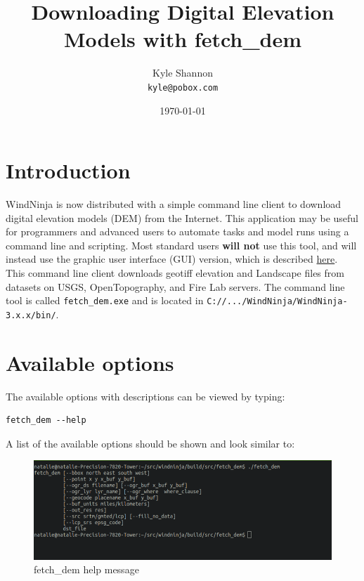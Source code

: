 \documentclass[12pt,oneside,final]{article}
\title{Downloading Digital Elevation Models with fetch\_dem}
\author{Kyle Shannon \\
\texttt{kyle@pobox.com}}
\date{\today}
\begin{document}
\maketitle

\section{Introduction}
WindNinja is now distributed with a simple command line client to download
digital elevation models (DEM) from the Internet.  This application may be
useful for programmers and advanced users to automate tasks and model runs using a
command line and scripting.
Most standard users \textbf{will not} use this tool, and will instead use the graphic
user interface (GUI) version, which is described
\href{run:./download_elevation_file.pdf}{here}.  This
command line client downloads geotiff elevation and Landscape files from
datasets on USGS, OpenTopography, and Fire Lab servers.  The command line tool is called \texttt{fetch\_dem.exe} and
is located in \texttt{C://.../WindNinja/WindNinja-3.x.x/bin/}.
\section{Available options}
The available options with descriptions can be viewed by typing:
\begin{verbatim}fetch_dem --help\end{verbatim}
A list of the available options should be shown and look similar to:
\begin{figure}[ht!]
    \centering
    \includegraphics[width=5in]{images/fetch_dem_1.png}
    \caption{fetch\_dem help message}
\end{figure}
\end{document}
